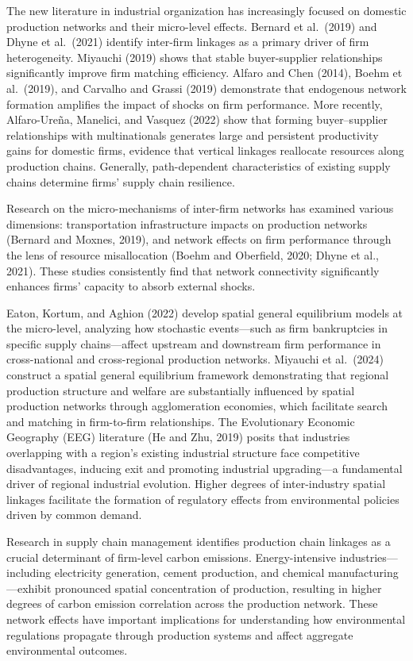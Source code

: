 \documentclass[11pt,a4paper]{article}
\begin{document}
The new literature in industrial organization has increasingly focused on domestic production networks and their micro-level effects. Bernard et al.\ (2019) and Dhyne et al.\ (2021) identify inter-firm linkages as a primary driver of firm heterogeneity. Miyauchi (2019) shows that stable buyer-supplier relationships significantly improve firm matching efficiency. Alfaro and Chen (2014), Boehm et al.\ (2019), and Carvalho and Grassi (2019) demonstrate that endogenous network formation amplifies the impact of shocks on firm performance. More recently, Alfaro-Ure\~na, Manelici, and Vasquez (2022) show that forming buyer--supplier relationships with multinationals generates large and persistent productivity gains for domestic firms, evidence that vertical linkages reallocate resources along production chains. Generally, path-dependent characteristics of existing supply chains determine firms' supply chain resilience.

Research on the micro-mechanisms of inter-firm networks has examined various dimensions: transportation infrastructure impacts on production networks (Bernard and Moxnes, 2019), and network effects on firm performance through the lens of resource misallocation (Boehm and Oberfield, 2020; Dhyne et al., 2021). These studies consistently find that network connectivity significantly enhances firms' capacity to absorb external shocks.

Eaton, Kortum, and Aghion (2022) develop spatial general equilibrium models at the micro-level, analyzing how stochastic events---such as firm bankruptcies in specific supply chains---affect upstream and downstream firm performance in cross-national and cross-regional production networks. Miyauchi et al.\ (2024) construct a spatial general equilibrium framework demonstrating that regional production structure and welfare are substantially influenced by spatial production networks through agglomeration economies, which facilitate search and matching in firm-to-firm relationships. The Evolutionary Economic Geography (EEG) literature (He and Zhu, 2019) posits that industries overlapping with a region's existing industrial structure face competitive disadvantages, inducing exit and promoting industrial upgrading---a fundamental driver of regional industrial evolution. Higher degrees of inter-industry spatial linkages facilitate the formation of regulatory effects from environmental policies driven by common demand.

Research in supply chain management identifies production chain linkages as a crucial determinant of firm-level carbon emissions. Energy-intensive industries---including electricity generation, cement production, and chemical manufacturing---exhibit pronounced spatial concentration of production, resulting in higher degrees of carbon emission correlation across the production network. These network effects have important implications for understanding how environmental regulations propagate through production systems and affect aggregate environmental outcomes.
\end{document}
